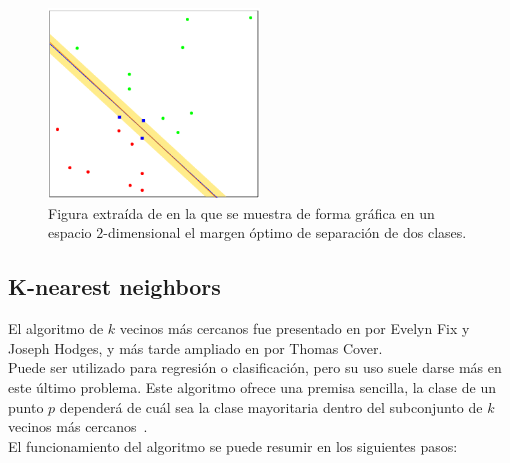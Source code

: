 \begin{figure}[htp]
    \begin{center}
        \includegraphics[width=0.5\textwidth]{imagenes/svm-margin.png}
    \end{center}
    \caption[Margen en SVM]{Figura extraída de \cite{hastie2009elements} en la que se muestra de forma gráfica en un espacio $2$-dimensional el margen óptimo de separación de dos clases.}
\end{figure}

\subsection{K-nearest neighbors}
El algoritmo de $k$ vecinos más cercanos fue presentado en \cite{fix_discriminatory_1989} por Evelyn Fix y Joseph Hodges, y más tarde ampliado en \cite{cover_nearest_1967} por Thomas Cover.\\[6pt]
Puede ser utilizado para regresión o clasificación, pero su uso suele darse más en este último problema. Este algoritmo ofrece una premisa sencilla, la clase de un punto $p$ dependerá de cuál sea la clase mayoritaria dentro del subconjunto de $k$ vecinos más cercanos~\cite{10.1007/978-3-540-39964-3_62}.\\[6pt]
El funcionamiento del algoritmo se puede resumir en los siguientes pasos:

